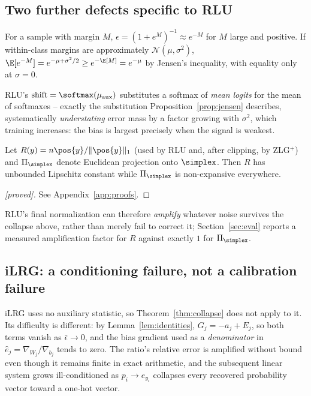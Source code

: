 \subsection{Two further defects specific to RLU}

\begin{proposition}
\label{prop:jensen}
For a sample with margin $M$, $\epsilon = (1+e^M)^{-1} \approx e^{-M}$ for
$M$ large and positive. If within-class margins are approximately
$\mathcal N(\mu,\sigma^2)$, $\E[e^{-M}] = e^{-\mu+\sigma^2/2} \ge
e^{-\E[M]} = e^{-\mu}$ by Jensen's inequality, with equality only at
$\sigma=0$.
\end{proposition}

RLU's $\mathrm{shift} = \softmax(\mu_{\mathrm{aux}})$ substitutes a
softmax of \emph{mean logits} for the mean of softmaxes -- exactly the
substitution Proposition~\ref{prop:jensen} describes, systematically
\emph{understating} error mass by a factor growing with $\sigma^2$, which
training increases: the bias is largest precisely when the signal is
weakest.

\begin{proposition}
\label{prop:lip}
Let $R(y) = n\pos{y}/\|\pos{y}\|_1$ (used by RLU and, after clipping, by
ZLG$^+$) and $\Pi_\simplex$ denote Euclidean projection onto $\simplex$.
Then $R$ has unbounded Lipschitz constant while $\Pi_\simplex$ is
non-expansive everywhere.
\end{proposition}

\begin{proof}[\textnormal{[proved]}]
See Appendix~\ref{app:proofs}.
\end{proof}

RLU's final normalization can therefore \emph{amplify} whatever noise
survives the collapse above, rather than merely fail to correct it;
Section~\ref{sec:eval} reports a measured amplification factor for $R$
against exactly $1$ for $\Pi_\simplex$.

\subsection{iLRG: a conditioning failure, not a calibration failure}

iLRG uses no auxiliary statistic, so Theorem~\ref{thm:collapse} does not
apply to it. Its difficulty is different: by Lemma~\ref{lem:identities},
$G_j = -a_j + E_j$, so both terms vanish as $\bar\epsilon\to0$, and the
bias gradient used as a \emph{denominator} in $\hat e_j =
\nabla_{W_j}/\nabla_{b_j}$ tends to zero. The ratio's relative error is
amplified without bound even though it remains finite in exact
arithmetic, and the subsequent linear system grows ill-conditioned as
$p_i\to e_{y_i}$ collapses every recovered probability vector toward a
one-hot vector.

